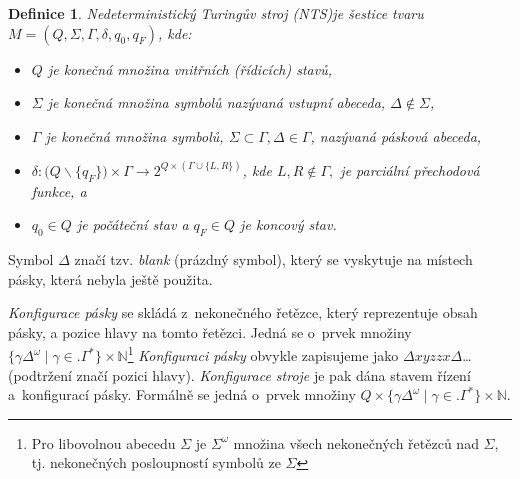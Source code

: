 \documentclass[a4paper, 11pt, twocolumn]{article}
\newtheorem{definition}{Definice}
\begin{document}
        \begin{definition}
        Nedeterministický Turingův stroj (NTS)\emph{je šestice tvaru} $ M = (Q,\Sigma, \Gamma, \delta, q_0, q_F) $, kde:
        \begin{itemize}
            \item $ Q $ je konečná množina \emph{vnitřních (řídicích) stavů},
            \item $ \Sigma $ je konečná množina symbolů nazývaná \emph{vstupní abeceda,} $ \Delta \notin \Sigma$,
            \item $ \Gamma $ je konečná množina symbolů, $\Sigma \subset \Gamma, \Delta \in \Gamma $, nazývaná \emph{pásková abeceda,}
            \item $ \delta :(Q \backslash \{ $$q_F \}) \times \Gamma \rightarrow $$2^{Q\times(\Gamma\cup\{L,R\})}$\emph{, kde $L, R \notin \Gamma,$ je parciální přechodová funkce, a}
            \item $ q_0 \in Q$ je \emph{počáteční stav} a $ q_F \in Q$ je \emph{koncový stav.}
        \end{itemize}
        
        \end{definition}
        Symbol $ \Delta $ značí tzv. \emph{blank} (prázdný symbol), který se vyskytuje na místech pásky, která nebyla ještě použita.
         
        \textit{Konfigurace pásky} se skládá z~nekonečného řetězce, který reprezentuje obsah pásky, a pozice hlavy na tomto řetězci. Jedná se o~prvek množiny $ \{\gamma\Delta^\omega \mid \gamma \in. \Gamma^*\} \times \mathbb{N}$\footnote{Pro libovolnou abecedu $ \Sigma $ je $ \Sigma^\omega $ množina všech nekonečných řetězců nad $ \Sigma $, tj. nekonečných posloupností symbolů ze $ \Sigma $}
        \textit{Konfiguraci pásky} obvykle zapisujeme jako $ \Delta xyzzx\Delta $\dots\\ (podtržení značí pozici hlavy).
        \textit{Konfigurace stroje} je pak dána stavem řízení a~konfigurací pásky. Formálně se jedná o~prvek množiny $ Q \times \{\gamma\Delta^\omega \mid \gamma \in. \Gamma^*\} \times \mathbb{N} $.
        
\end{document}

